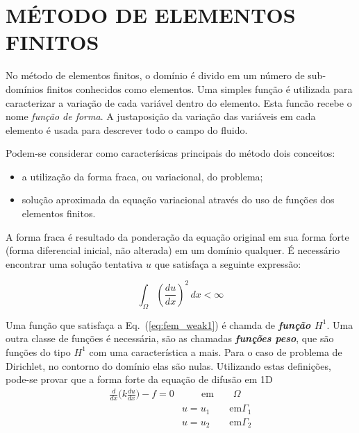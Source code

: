 \typeout{ ====================================================================}
\typeout{ ====================================================================}


\section{MÉTODO DE ELEMENTOS FINITOS}

No método de elementos finitos, o domínio é divido em um número
de sub-domínios finitos conhecidos como elementos.  Uma simples função é
utilizada para caracterizar a variação de cada variável dentro do
elemento.  Esta funcão recebe o nome \emph{função de forma}.  A
justaposição da variação das variáveis em cada elemento é usada
para descrever todo o campo do fluido.  

Podem-se considerar como caracterísicas principais do método dois
conceitos:

\begin{itemize}
	\item a utilização da forma fraca, ou variacional, do problema;
	\item solução aproximada da equação variacional através do uso de
	funções dos elementos finitos.
\end{itemize}

A forma fraca é resultado da ponderação da equação original em sua forma
forte (forma diferencial inicial, não alterada) em um domínio qualquer.  É
necessário encontrar uma solução tentativa $u$ que satisfaça a seguinte
expressão:

\begin{equation}
	\int_{\Omega} (\frac{du}{dx})^2 \, dx < \infty
\label{eq:fem_weak1}
\end{equation}\hspace{0.5cm}

Uma função que satisfaça a Eq.~(\ref{eq:fem_weak1}) é chamda de
\textbf{\textit{função $H^1$}}. 
Uma outra classe de funções é necessária, são as chamadas
\textbf{\textit{funções peso}}, que são funções do tipo $H^1$ com uma
característica a mais.  Para o caso de problema de Dirichlet, no contorno 
do domínio elas são nulas.  Utilizando estas definições, pode-se provar
\cite{hughes1987} que a forma forte da equação de difusão em 1D
\begin{align}
	\frac{d}{dx} \bigg( k\frac{du}{dx} \bigg) -f 
	= 
	0&
	\qquad
	\text{em}
	\qquad
	\Omega
	\\
	&u=u_1 \qquad \text{em} \Gamma_1
	\\
	&u=u_2 \qquad \text{em} \Gamma_2
\label{eq:fem1}
\end{align}

